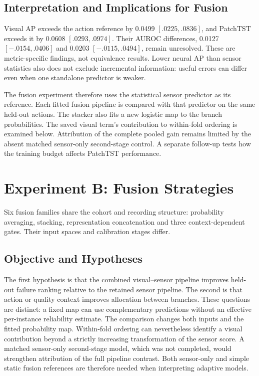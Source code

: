 \subsection{Interpretation and Implications for Fusion}
Visual AP exceeds the action reference by 0.0499 $[.0225,.0836]$, and PatchTST exceeds
it by 0.0608 $[.0293,.0974]$. Their AUROC differences, 0.0127 $[-.0154,.0406]$ and
0.0203 $[-.0115,.0494]$, remain unresolved. These are metric-specific findings, not
equivalence results. Lower neural AP than sensor statistics also does not exclude
incremental information: useful errors can differ even when one standalone predictor is
weaker.

The fusion experiment therefore uses the statistical sensor predictor as its reference.
Each fitted fusion pipeline is compared with that predictor on the same held-out
actions. The stacker also fits a new logistic map to the branch probabilities. The saved
visual term's contribution to within-fold ordering is examined below. Attribution of the
complete pooled gain remains limited by the absent matched sensor-only second-stage
control. A separate follow-up tests how the training budget affects PatchTST
performance.

\section{Experiment B: Fusion Strategies}
Six fusion families share the cohort and recording structure: probability averaging,
stacking, representation concatenation and three context-dependent gates. Their input
spaces and calibration stages differ.

\subsection{Objective and Hypotheses}
The first hypothesis is that the combined visual--sensor pipeline improves held-out
failure ranking relative to the retained sensor pipeline. The second is that action or
quality context improves allocation between branches. These questions are distinct: a
fixed map can use complementary predictions without an effective per-instance
reliability estimate. The comparison changes both inputs and the fitted probability map.
Within-fold ordering can nevertheless identify a visual contribution beyond a strictly
increasing transformation of the sensor score. A matched sensor-only second-stage model,
which was not completed, would strengthen attribution of the full pipeline contrast.
Both sensor-only and simple static fusion references are therefore needed when
interpreting adaptive models.

